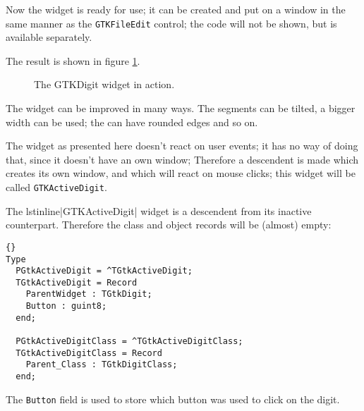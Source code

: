 \documentclass[10pt]{article}
\begin{document}
Now the widget is ready for use; it can be created and put on a window
in the same manner as the \lstinline|GTKFileEdit| control; the code will
not be shown, but is available separately. 

The result is shown in figure \ref{fig:ex2}.
\begin{figure}
\begin{center}
\caption{The GTKDigit widget in action.}\label{fig:ex2}
\end{center}
\end{figure}

The widget can be improved in many ways. The segments can be tilted, a
bigger width can be used; the can have rounded edges and so on.

The widget as presented here doesn't react on user events; it has no way
of doing that, since it doesn't have an own window; Therefore a descendent
is made which creates its own window, and which will react on mouse clicks;
this widget will be called \lstinline|GTKActiveDigit|.

The lstinline|GTKActiveDigit| widget is a descendent from its inactive
counterpart. Therefore the class and object records will be (almost) empty:
\begin{lstlisting}{}
Type
  PGtkActiveDigit = ^TGtkActiveDigit;  
  TGtkActiveDigit = Record 
    ParentWidget : TGtkDigit;
    Button : guint8;
  end;
  
  PGtkActiveDigitClass = ^TGtkActiveDigitClass;
  TGtkActiveDigitClass = Record
    Parent_Class : TGtkDigitClass;
  end;
\end{lstlisting}
The \lstinline|Button| field is used to store which button was used to click
on the digit. 
\end{document}
